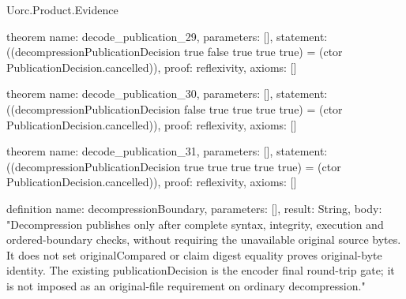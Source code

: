 \begin{lexlean}{Uorc.Product.Evidence}
\begin{semanticmodule}
theorem{
  name: decode_publication_29,
  parameters: [],
  statement: ((decompressionPublicationDecision true false true true true) = (ctor PublicationDecision.cancelled)),
  proof: reflexivity{},
  axioms: []
}

theorem{
  name: decode_publication_30,
  parameters: [],
  statement: ((decompressionPublicationDecision false true true true true) = (ctor PublicationDecision.cancelled)),
  proof: reflexivity{},
  axioms: []
}

theorem{
  name: decode_publication_31,
  parameters: [],
  statement: ((decompressionPublicationDecision true true true true true) = (ctor PublicationDecision.cancelled)),
  proof: reflexivity{},
  axioms: []
}

definition{
  name: decompressionBoundary,
  parameters: [],
  result: String,
  body: "Decompression publishes only after complete syntax, integrity, execution and ordered-boundary checks, without requiring the unavailable original source bytes. It does not set originalCompared or claim digest equality proves original-byte identity. The existing publicationDecision is the encoder final round-trip gate; it is not imposed as an original-file requirement on ordinary decompression."
}
\end{semanticmodule}
\end{lexlean}
